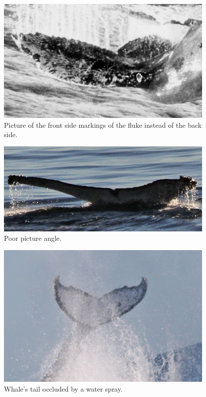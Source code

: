 \documentclass[12pt,
    brazil,			%
	english,        %
	]{article}
\begin{document}
\begin{figure}
    \centering
    \includegraphics[width=0.95\textwidth]{images/whales/0ce588f3d.jpg}
    \caption{Picture of the front side markings of the fluke instead of the back side.}
    \label{fig:whale:0ce588f3d}
\end{figure}

\begin{figure}
    \centering
    \includegraphics[width=0.95\textwidth]{images/whales/0d0a1d2fb.jpg}
    \caption{Poor picture angle.}
    \label{fig:whale:0d0a1d2fb}
\end{figure}

\begin{figure}
    \centering
    \includegraphics[width=0.95\textwidth]{images/whales/0d7bd80d3.jpg}
    \caption{Whale's tail occluded by a water spray.}
    \label{fig:whale:0d7bd80d3}
\end{figure}
\end{document}
